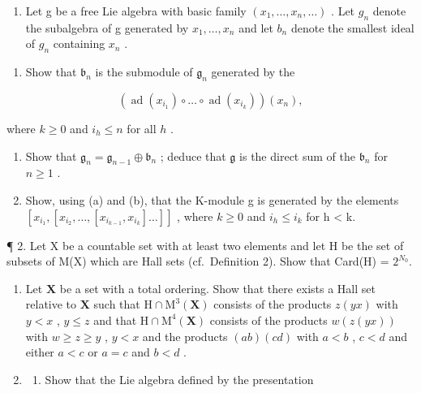 
\begin{enumerate}
\def\labelenumi{\arabic{enumi}.}
\tightlist
\item
  Let g be a free Lie algebra with basic family \((x_{1},\ldots,x_{n},\ldots)\) . Let \(g_{n}\) denote the subalgebra of g generated by \(x_{1},\ldots,x_{n}\) and let \(b_{n}\) denote the smallest ideal of \(g_{n}\) containing \(x_{n}\) .
\end{enumerate}

\begin{enumerate}
\def\labelenumi{(\alph{enumi})}
\tightlist
\item
  Show that \(\mathfrak{b}_n\) is the submodule of \(\mathfrak{g}_n\) generated by the
\end{enumerate}

\[
\left(\operatorname{ad} \left(x _ {i _ {1}}\right) \circ \dots \circ \operatorname{ad} \left(x _ {i _ {k}}\right)\right) \left(x _ {n}\right),
\]

where \(k \geqslant 0\) and \(i_h \leqslant n\) for all \(h\) .

\begin{enumerate}
\def\labelenumi{(\alph{enumi})}
\setcounter{enumi}{1}
\item
  Show that \(\mathfrak{g}_n = \mathfrak{g}_{n-1} \oplus \mathfrak{b}_n\) ; deduce that \(\mathfrak{g}\) is the direct sum of the \(\mathfrak{b}_n\) for \(n \geqslant 1\) .
\item
  Show, using (a) and (b), that the K-module g is generated by the elements \([x_{i_{1}}, [x_{i_{2}}, \ldots, [x_{i_{k-1}}, x_{i_{k}}] \ldots]]\) , where \(k \geqslant 0\) and \(i_{h} \leqslant i_{k}\) for h \textless{} k.
\end{enumerate}

¶ 2. Let X be a countable set with at least two elements and let H be the set of subsets of M(X) which are Hall sets (cf.~Definition 2). Show that Card(H) = \(2^{N_0}\).

\begin{enumerate}
\def\labelenumi{\arabic{enumi}.}
\setcounter{enumi}{2}
\item
  Let \(\mathbf{X}\) be a set with a total ordering. Show that there exists a Hall set relative to \(\mathbf{X}\) such that \(\mathrm{H} \cap \mathrm{M}^3(\mathbf{X})\) consists of the products \(z(yx)\) with \(y < x\) , \(y \leqslant z\) and that \(\mathrm{H} \cap \mathrm{M}^4(\mathbf{X})\) consists of the products \(w(z(yx))\) with \(w \geqslant z \geqslant y\) , \(y < x\) and the products \((ab)(cd)\) with \(a < b\) , \(c < d\) and either \(a < c\) or \(a = c\) and \(b < d\) .
\item
  \begin{enumerate}
  \def\labelenumii{(\alph{enumii})}
  \tightlist
  \item
    Show that the Lie algebra defined by the presentation
  \end{enumerate}
\end{enumerate}

